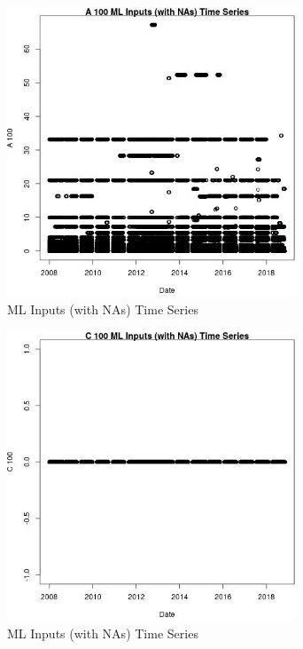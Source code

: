 \begin{figure} 
\centering  
\includegraphics[width=0.77\textwidth]{Code_Outputs/Report_ML_input_PM25_Step4_part_e_de_duplicated_aves_compiled_2019-05-20wNAs_A_100vDate.jpg} 
\caption{\label{fig:Report_ML_input_PM25_Step4_part_e_de_duplicated_aves_compiled_2019-05-20wNAsA_100vDate}ML Inputs (with NAs) Time Series} 
\end{figure} 
 

\begin{figure} 
\centering  
\includegraphics[width=0.77\textwidth]{Code_Outputs/Report_ML_input_PM25_Step4_part_e_de_duplicated_aves_compiled_2019-05-20wNAs_C_100vDate.jpg} 
\caption{\label{fig:Report_ML_input_PM25_Step4_part_e_de_duplicated_aves_compiled_2019-05-20wNAsC_100vDate}ML Inputs (with NAs) Time Series} 
\end{figure} 
 

